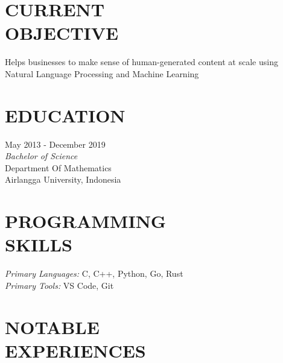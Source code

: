 \documentclass[margin, 10pt]{res} %
\begin{document}
\begin{resume}

 \section{CURRENT\\OBJECTIVE}

Helps businesses to make sense of human-generated content at scale using Natural Language Processing
and Machine Learning


\section{EDUCATION}

May 2013 - December 2019 \\
{\sl Bachelor of Science} \\
Department Of Mathematics \\
Airlangga University, Indonesia


\section{PROGRAMMING\\ SKILLS}

{\sl Primary Languages:} C, C++, Python, Go, Rust \\
{\sl Primary Tools:} VS Code, Git


\section{NOTABLE\\EXPERIENCES}


\end{resume}
\end{document}

